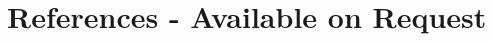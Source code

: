 \documentclass[10pt, letterpaper]{article}
\newenvironment{highlights}{
    \begin{itemize}[
        topsep=0.10 cm,
        parsep=0.10 cm,
        partopsep=0pt,
        itemsep=0pt,
        leftmargin=0.4 cm + 10pt
    ]
}{
    \end{itemize}
} %
\newenvironment{twocolentry}[2][]{
    \onecolentry
    \def\secondColumn{#2}
    \setcolumnwidth{\fill, 4.5 cm}
    \begin{paracol}{2}
}{
    \switchcolumn \raggedleft \secondColumn
    \end{paracol}
    \endonecolentry
} %
\begin{document}





\section{References - Available on Request}
\end{document}

